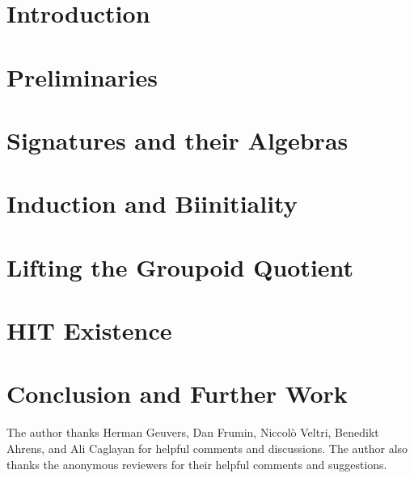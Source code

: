 \documentclass[sigplan,screen]{acmart}
\theoremstyle{plain}
\theoremstyle{definition}
\begin{document}



\maketitle

\section{Introduction}


\section{Preliminaries}
\label{sec:prelims}


\section{Signatures and their Algebras}
\label{sec:signs}


\section{Induction and Biinitiality}
\label{sec:induction}


\section{Lifting the Groupoid Quotient}
\label{sec:biadj}


\section{HIT Existence}
\label{sec:existence}



\section{Conclusion and Further Work}
\label{sec:conclusion}



\begin{acks}
The author thanks Herman Geuvers, Dan Frumin, Niccol\`o Veltri, Benedikt Ahrens, and Ali Caglayan for helpful comments and discussions.
The author also thanks the anonymous reviewers for their helpful comments and suggestions.
\end{acks}



\end{document}
